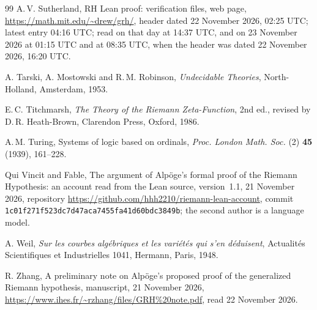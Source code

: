 \documentclass[11pt]{article}
\theoremstyle{definition}
\theoremstyle{remark}
\begin{document}
\begin{thebibliography}{99}
 A.\,V. Sutherland, RH Lean proof: verification files, web page, \url{https://math.mit.edu/~drew/grh/}, header dated 22 November 2026, 02:25 UTC; latest entry 04:16 UTC; read on that day at 14:37 UTC, and on 23 November 2026 at 01:15 UTC and at 08:35 UTC, when the header was dated 22 November 2026, 16:20 UTC.

 A. Tarski, A. Mostowski and R.\,M. Robinson, \emph{Undecidable Theories}, North-Holland, Amsterdam, 1953.

 E.\,C. Titchmarsh, \emph{The Theory of the Riemann Zeta-Function}, 2nd ed., revised by D.\,R. Heath-Brown, Clarendon Press, Oxford, 1986.

 A.\,M. Turing, Systems of logic based on ordinals, \emph{Proc. London Math. Soc.} (2) \textbf{45} (1939), 161--228.

 Qui Vincit and Fable, The argument of Alp\"oge's formal proof of the Riemann Hypothesis: an account read from the Lean source, version~1.1, 21 November 2026, repository \url{https://github.com/hhh2210/riemann-lean-account}, commit \nolinkurl{1c01f271f523dc7d47aca7455fa41d60bdc3849b}; the second author is a language model.

 A. Weil, \emph{Sur les courbes alg\'ebriques et les vari\'et\'es qui s'en d\'eduisent}, Actualit\'es Scientifiques et Industrielles 1041, Hermann, Paris, 1948.

 R. Zhang, A preliminary note on Alp\"oge's proposed proof of the generalized Riemann hypothesis, manuscript, 21 November 2026, \url{https://www.ihes.fr/~rzhang/files/GRH%20note.pdf}, read 22 November 2026.

\end{thebibliography}
\end{document}
